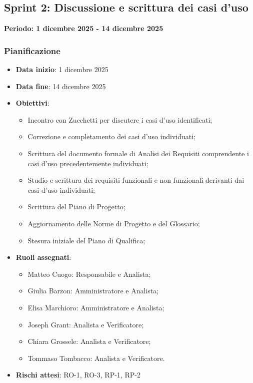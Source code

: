 \documentclass[11pt,a4paper]{article}
\begin{document}
\newpage
\subsection{Sprint 2: Discussione e scrittura dei casi d'uso}
{\textbf{Periodo: 1 dicembre 2025 - 14 dicembre 2025}\par}

\subsubsection{Pianificazione}
\begin{itemize}
    \item \textbf{Data inizio}: 1 dicembre 2025
    \item \textbf{Data fine}: 14 dicembre 2025
    \item \textbf{Obiettivi}:
    \begin{itemize}
        \item Incontro con Zucchetti per discutere i casi d'uso identificati;
        \item Correzione e completamento dei casi d'uso individuati;
        \item Scrittura del documento formale di Analisi dei Requisiti comprendente i casi d'uso precedentemente individuati;
        \item Studio e scrittura dei requisiti funzionali e non funzionali derivanti dai casi d'uso individuati;
        \item Scrittura del Piano di Progetto;
        \item Aggiornamento delle Norme di Progetto e del Glossario;
        \item Stesura iniziale del Piano di Qualifica;
    \end{itemize}
    \item \textbf{Ruoli assegnati}:
    \begin{itemize}
        \item Matteo Cuogo: Responsabile e Analista;
        \item Giulia Barzon: Amministratore e Analista;
        \item Elisa Marchioro: Amministratore e Analista;
        \item Joseph Grant: Analista e Verificatore;
        \item Chiara Grossele: Analista e Verificatore;
        \item Tommaso Tombacco: Analista e Verificatore.
    \end{itemize}
    \item \textbf{Rischi attesi}: RO-1, RO-3, RP-1, RP-2
\end{itemize}
\end{document}
